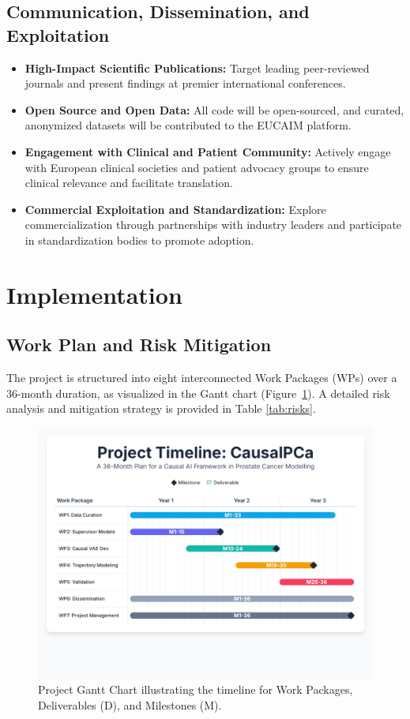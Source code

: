 \documentclass[11pt, a4paper]{article}
\begin{document}
\subsection{Communication, Dissemination, and Exploitation}
\begin{itemize}
    \item \textbf{High-Impact Scientific Publications:} Target leading peer-reviewed journals and present findings at premier international conferences.
    \item \textbf{Open Source and Open Data:} All code will be open-sourced, and curated, anonymized datasets will be contributed to the EUCAIM platform.
    \item \textbf{Engagement with Clinical and Patient Community:} Actively engage with European clinical societies and patient advocacy groups to ensure clinical relevance and facilitate translation.
    \item \textbf{Commercial Exploitation and Standardization:} Explore commercialization through partnerships with industry leaders and participate in standardization bodies to promote adoption.
\end{itemize}

\section{Implementation}

\subsection{Work Plan and Risk Mitigation}
The project is structured into eight interconnected Work Packages (WPs) over a 36-month duration, as visualized in the Gantt chart (Figure~\ref{fig:gantt}). A detailed risk analysis and mitigation strategy is provided in Table \ref{tab:risks}.

\begin{figure}[H]
    \centering
    \includegraphics[width=\textwidth]{gantt.png}
    \caption{Project Gantt Chart illustrating the timeline for Work Packages, Deliverables (D), and Milestones (M).}
    \label{fig:gantt}
\end{figure}
\end{document}
